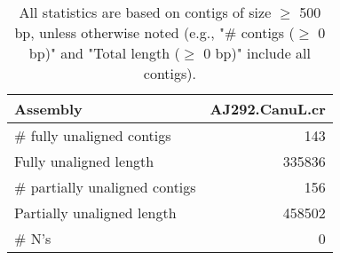 \documentclass[12pt,a4paper]{article}
\begin{document}
\begin{table}[ht]
\begin{center}
\caption{All statistics are based on contigs of size $\geq$ 500 bp, unless otherwise noted (e.g., "\# contigs ($\geq$ 0 bp)" and "Total length ($\geq$ 0 bp)" include all contigs).}
\begin{tabular}{|l*{1}{|r}|}
\hline
Assembly & AJ292.CanuL.cr \\ \hline
\# fully unaligned contigs & 143 \\ \hline
Fully unaligned length & 335836 \\ \hline
\# partially unaligned contigs & 156 \\ \hline
Partially unaligned length & 458502 \\ \hline
\# N's & 0 \\ \hline
\end{tabular}
\end{center}
\end{table}
\end{document}
